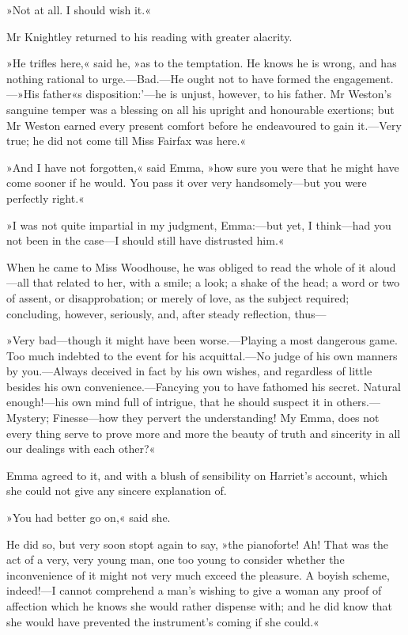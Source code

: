 »Not at all. I should wish it.«

Mr Knightley returned to his reading with greater alacrity.

»He trifles here,« said he, »as to the temptation. He knows he is wrong, and has nothing rational to urge.—Bad.—He ought not to have formed the engagement.—»His father«s disposition:'—he is unjust, however, to his father. Mr Weston's sanguine temper was a blessing on all his upright and honourable exertions; but Mr Weston earned every present comfort before he endeavoured to gain it.—Very true; he did not come till Miss Fairfax was here.«

»And I have not forgotten,« said Emma, »how sure you were that he might have come sooner if he would. You pass it over very handsomely—but you were perfectly right.«

»I was not quite impartial in my judgment, Emma:—but yet, I think—had you not been in the case—I should still have distrusted him.«

When he came to Miss Woodhouse, he was obliged to read the whole of it aloud—all that related to her, with a smile; a look; a shake of the head; a word or two of assent, or disapprobation; or merely of love, as the subject required; concluding, however, seriously, and, after steady reflection, thus—

»Very bad—though it might have been worse.—Playing a most dangerous game. Too much indebted to the event for his acquittal.—No judge of his own manners by you.—Always deceived in fact by his own wishes, and regardless of little besides his own convenience.—Fancying you to have fathomed his secret. Natural enough!—his own mind full of intrigue, that he should suspect it in others.—Mystery; Finesse—how they pervert the understanding! My Emma, does not every thing serve to prove more and more the beauty of truth and sincerity in all our dealings with each other?«

Emma agreed to it, and with a blush of sensibility on Harriet's account, which she could not give any sincere explanation of.

»You had better go on,« said she.

He did so, but very soon stopt again to say, »the pianoforte! Ah! That was the act of a very, very young man, one too young to consider whether the inconvenience of it might not very much exceed the pleasure. A boyish scheme, indeed!—I cannot comprehend a man's wishing to give a woman any proof of affection which he knows she would rather dispense with; and he did know that she would have prevented the instrument's coming if she could.«

